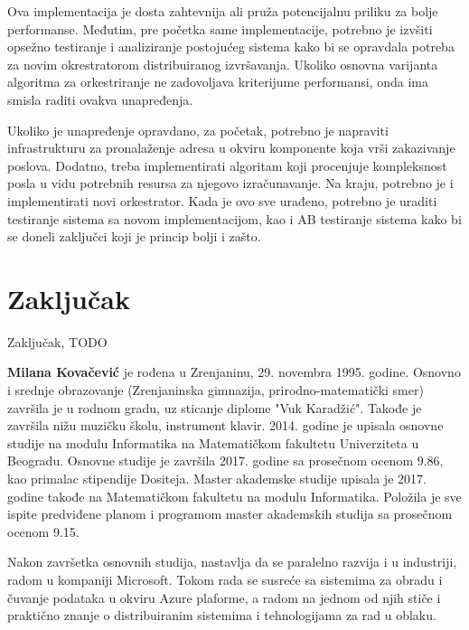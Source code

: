 \documentclass[12pt,oneside]{memoir}
\begin{document}
Ova implementacija je dosta zahtevnija ali pruža potencijalnu priliku za bolje performanse. Međutim, pre početka same implementacije, potrebno je izvšiti opsežno testiranje i analiziranje postojućeg sistema kako bi se opravdala potreba za novim okrestratorom distribuiranog izvršavanja. Ukoliko osnovna varijanta algoritma za orkestriranje ne zadovoljava kriterijume performansi, onda ima smisla raditi ovakva unapređenja.

Ukoliko je unapređenje opravdano, za početak, potrebno je napraviti infrastrukturu za pronalaženje adresa u okviru komponente koja vrši zakazivanje poslova. Dodatno, treba implementirati algoritam koji procenjuje kompleksnost posla u vidu potrebnih resursa za njegovo izračunavanje. Na kraju, potrebno je i implementirati novi orkestrator. Kada je ovo sve urađeno, potrebno je uraditi testiranje sistema sa novom implementacijom, kao i AB testiranje sistema kako bi se doneli zaključci koji je princip bolji i zašto.


\section{Zaključak}
Zaključak, TODO

\literatura

\backmatter

\begin{biografija}
  \textbf{Milana Kovačević} je rođena u Zrenjaninu, 29. novembra 1995. godine. Osnovno i srednje obrazovanje (Zrenjaninska gimnazija, prirodno-matematički smer) završila je u rodnom gradu, uz sticanje diplome "Vuk Karadžić". Takođe je završila nižu muzičku školu, instrument klavir.
2014. godine je upisala osnovne studije na modulu Informatika na Matematičkom fakultetu Univerziteta u Beogradu. Osnovne studije je završila 2017. godine sa prosečnom ocenom 9.86, kao primalac stipendije Dositeja. Master akademske studije upisala je 2017. godine takođe na Matematičkom fakultetu na modulu Informatika. Položila je sve ispite predviđene planom i programom master akademskih studija sa prosečnom ocenom 9.15.

Nakon završetka osnovnih studija, nastavlja da se paralelno razvija i u industriji, radom u kompaniji Microsoft. Tokom rada se susreće sa sistemima za obradu i čuvanje podataka u okviru Azure plaforme, a radom na jednom od njih stiče i praktično znanje o distribuiranim sistemima i tehnologijama za rad u oblaku.

\end{biografija}
\end{document}
